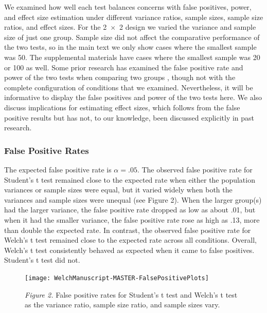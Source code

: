 \documentclass[man, noextraspace, apacite, floatsintext]{apa6}
\begin{document}
We examined how well each test balances concerns with 
false positives, power, and effect size estimation under 
different variance ratios, sample sizes, sample size ratios, and effect sizes. 
For the 2~$\times$~2 design we varied the variance and sample size of just one group. 
Sample size did not affect the comparative performance of the two tests, so in the main text we only show cases where the smallest sample was 50. The supplemental materials have cases where the smallest sample was 20 or 100 as well.  
Some prior research has examined the 
false positive rate \cite{Boneau1960, Zimmerman1993, 
Zimmerman2004, Zimmerman1996, Zimmerman2009} and
power of the two tests when comparing two groups \cite{Neuhauser2002, 
Zimmerman1993}, though not with the complete configuration of 
conditions that we examined. Nevertheless, it will be informative to display 
the false positives and power of the two tests here. We also discuss 
implications for estimating effect sizes, which follows from the false positive
results but has not, to our knowledge, been discussed explicitly in past 
research.

    
\subsubsection{False Positive Rates}

    The expected false positive rate is $\alpha = .05$. The observed false positive 
rate for Student's t test remained close to the expected rate when either 
the population variances or sample sizes were equal, but it varied widely 
when both the variances and sample sizes were unequal (see Figure 2). 
When the larger group(s) had the larger variance, the false positive rate dropped as low as 
about .01, but when it had the smaller 
variance, the false positive rate 
rose as high as .13, more than double the expected rate. 
In contrast, the observed false positive rate for Welch's t test 
remained close to the expected rate across all conditions. Overall, Welch's 
t test consistently behaved as expected when it came to false positives. 
Student's t test did not.


\begin{figure}[!ht]  

\texttt{[image: WelchManuscript-MASTER-FalsePositivePlots]}

\textit{Figure 2.} False positive rates for Student's t test and Welch's t test 
as the variance ratio, sample size ratio, and sample sizes vary.
\end{figure}
\end{document}
